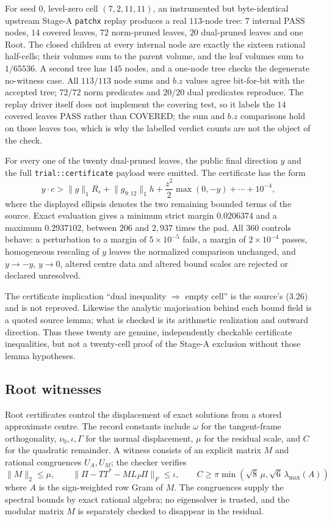 \documentclass[10pt]{article}
\theoremstyle{definition}
\newcommand{\norm}[1]{\lVert #1\rVert}
\begin{document}
For seed $0$, level-zero cell $(7,2,11,11)$, an instrumented but byte-identical upstream Stage-A \texttt{patchx} replay produces a real $113$-node tree: $7$ internal PASS nodes, $14$ covered leaves, $72$ norm-pruned leaves, $20$ dual-pruned leaves and one Root. The closed children at every internal node are exactly the sixteen rational half-cells; their volumes sum to the parent volume, and the leaf volumes sum to $1/65536$. A second tree has $145$ nodes, and a one-node tree checks the degenerate no-witness case. All $113/113$ node sums and $b.z$ values agree bit-for-bit with the accepted tree; $72/72$ norm predicates and $20/20$ dual predicates reproduce. The replay driver itself does not implement the covering test, so it labels the $14$ covered leaves PASS rather than COVERED; the sum and $b.z$ comparisons hold on those leaves too, which is why the labelled verdict counts are not the object of the check.

For every one of the twenty dual-pruned leaves, the public final direction $y$ and the full \texttt{trial::certificate} payload were emitted. The certificate has the form
\[
y\cdot c>\lVert g\rVert_1 R_s+\lVert g_{9:12}\rVert_1 h+\frac{z^2}{2}\max(0,-y)+\cdots+10^{-4},
\]
where the displayed ellipsis denotes the two remaining bounded terms of the source. Exact evaluation gives a minimum strict margin $0.0206374$ and a maximum $0.2937102$, between $206$ and $2{,}937$ times the pad. All $360$ controls behave: a perturbation to a margin of $5\times10^{-5}$ fails, a margin of $2\times10^{-4}$ passes, homogeneous rescaling of $y$ leaves the normalized comparison unchanged, and $y\to-y$, $y\to0$, altered centre data and altered bound scales are rejected or declared unresolved.

The certificate implication ``dual inequality $\Rightarrow$ empty cell'' is the source's (3.26) and is not reproved. Likewise the analytic majorisation behind each bound field is a quoted source lemma; what is checked is its arithmetic realization and outward direction. Thus these twenty are genuine, independently checkable certificate inequalities, but not a twenty-cell proof of the Stage-A exclusion without those lemma hypotheses.

\subsection{Root witnesses}

Root certificates control the displacement of exact solutions from a stored approximate centre. The record constants include $\omega$ for the tangent-frame orthogonality, $\nu_0,\iota,\Gamma$ for the normal displacement, $\mu$ for the residual scale, and $C$ for the quadratic remainder. A witness consists of an explicit matrix $M$ and rational congruences $U_A,U_M$; the checker verifies
\[
\norm M_2\le\mu,\qquad
\norm{\Pi-TT^*-ML_P\Pi}_F\le\iota,\qquad
C\ge\pi\min(\sqrt8\,\mu,\sqrt6\,\lambda_{\max}(A))
\]
where $A$ is the sign-weighted row Gram of $M$. The congruences supply the spectral bounds by exact rational algebra; no eigensolver is trusted, and the modular matrix $M$ is separately checked to disappear in the residual.
\end{document}
